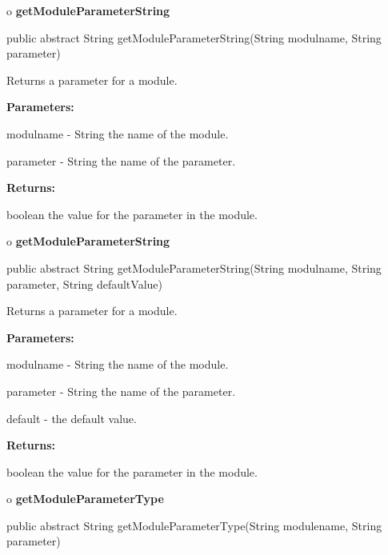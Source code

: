o {\bf getModuleParameterString} 

\begin{PRE}
 public abstract String getModuleParameterString(String modulname,
                                                 String parameter)
\end{PRE}

\begin{description}
\htmlDD Returns a parameter for a module. 

\begin{description}
\item {\bf Parameters:}  

modulname - String the name of the module.  

parameter - String the name of the parameter.  
\item {\bf Returns:}  

boolean the value for the parameter in the module.  
\end{description}

\end{description}

o {\bf getModuleParameterString} 

\begin{PRE}
 public abstract String getModuleParameterString(String modulname,
                                                 String parameter,
                                                 String defaultValue)
\end{PRE}

\begin{description}
\htmlDD Returns a parameter for a module. 

\begin{description}
\item {\bf Parameters:}  

modulname - String the name of the module.  

parameter - String the name of the parameter.  

default - the default value.  
\item {\bf Returns:}  

boolean the value for the parameter in the module.  
\end{description}

\end{description}

o {\bf getModuleParameterType} 

\begin{PRE}
 public abstract String getModuleParameterType(String modulename,
                                               String parameter)
\end{PRE}

